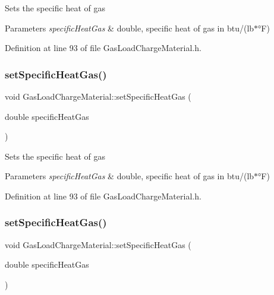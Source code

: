 Sets the specific heat of gas 
\begin{DoxyParams}{Parameters}
{\em specific\+Heat\+Gas} & double, specific heat of gas in btu/(lb$\ast$°F) \\
\hline
\end{DoxyParams}


Definition at line 93 of file Gas\+Load\+Charge\+Material.\+h.

\mbox{\label{class_gas_load_charge_material_a07bf6d4ee9161683fbeb3baad16ea7be}} 
\subsubsection{\texorpdfstring{set\+Specific\+Heat\+Gas()}{setSpecificHeatGas()}\hspace{0.1cm}{\footnotesize\ttfamily [2/3]}}
{\footnotesize\ttfamily void Gas\+Load\+Charge\+Material\+::set\+Specific\+Heat\+Gas (\begin{DoxyParamCaption}\item[{double}]{specific\+Heat\+Gas }\end{DoxyParamCaption})\hspace{0.3cm}{\ttfamily [inline]}}

Sets the specific heat of gas 
\begin{DoxyParams}{Parameters}
{\em specific\+Heat\+Gas} & double, specific heat of gas in btu/(lb$\ast$°F) \\
\hline
\end{DoxyParams}


Definition at line 93 of file Gas\+Load\+Charge\+Material.\+h.

\mbox{\label{class_gas_load_charge_material_a07bf6d4ee9161683fbeb3baad16ea7be}} 
\subsubsection{\texorpdfstring{set\+Specific\+Heat\+Gas()}{setSpecificHeatGas()}\hspace{0.1cm}{\footnotesize\ttfamily [3/3]}}
{\footnotesize\ttfamily void Gas\+Load\+Charge\+Material\+::set\+Specific\+Heat\+Gas (\begin{DoxyParamCaption}\item[{double}]{specific\+Heat\+Gas }\end{DoxyParamCaption})\hspace{0.3cm}{\ttfamily [inline]}}


